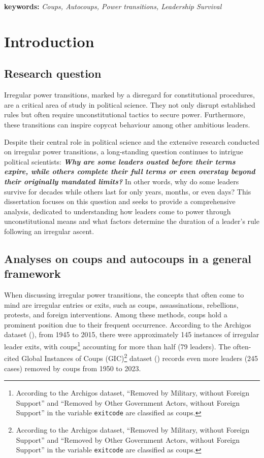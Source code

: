 \documentclass[
  12pt,
]{report}
\begin{document}
\textbf{keywords:} \emph{Coups, Autocoups, Power transitions, Leadership
Survival}

\chapter{Introduction}\label{introduction}

\section{Research question}\label{research-question}

Irregular power transitions, marked by a disregard for constitutional
procedures, are a critical area of study in political science. They not
only disrupt established rules but often require unconstitutional
tactics to secure power. Furthermore, these transitions can inspire
copycat behaviour among other ambitious leaders.

Despite their central role in political science and the extensive
research conducted on irregular power transitions, a long-standing
question continues to intrigue political scientists: \textbf{\emph{Why
are some leaders ousted before their terms expire, while others complete
their full terms or even overstay beyond their originally mandated
limits?}} In other words, why do some leaders survive for decades while
others last for only years, months, or even days? This dissertation
focuses on this question and seeks to provide a comprehensive analysis,
dedicated to understanding how leaders come to power through
unconstitutional means and what factors determine the duration of a
leader's rule following an irregular ascent.

\section{Analyses on coups and autocoups in a general
framework}\label{analyses-on-coups-and-autocoups-in-a-general-framework}

When discussing irregular power transitions, the concepts that often
come to mind are irregular entries or exits, such as coups,
assassinations, rebellions, protests, and foreign interventions. Among
these methods, coups hold a prominent position due to their frequent
occurrence. According to the Archigos dataset
(), from
1945 to 2015, there were approximately 145 instances of irregular leader
exits, with coups\footnote{According to the Archigos dataset, ``Removed
  by Military, without Foreign Support'' and ``Removed by Other
  Government Actors, without Foreign Support'' in the variable
  \texttt{exitcode} are classified as coups.} accounting for more than
half (79 leaders). The often-cited Global Instances of Coups
(GIC)\footnote{According to the Archigos dataset, ``Removed by Military,
  without Foreign Support'' and ``Removed by Other Government Actors,
  without Foreign Support'' in the variable \texttt{exitcode} are
  classified as coups.} dataset () records even more leaders (245 cases) removed by coups
from 1950 to 2023.
\end{document}
